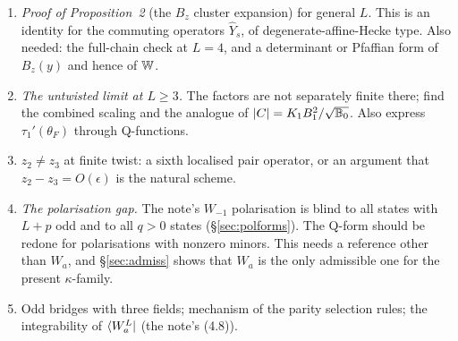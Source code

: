 \begin{enumerate}
  \emph{New route (untested idea, 13 Oct, after Proposition 1).} The proof of Proposition~1 works pair by pair. So any companion
  bra whose F sites are $e_4^Tf(G_c)q_p(G_c)$ on pair $p$, with A sites chosen to make each pair BPS, has the overlaps of a
  multi-block $W$-bra on the sectors $(\mu,0,0,-\mu)$. In particular, rotating the first $M$ pairs of $(e_1\otimes\tilde u)^{\otimes L}$
  by $g=1-\kappa G_c$ gives
  \begin{gather*}
  \Big\langle\big(e_1^T(1-\kappa G_c^T)\otimes\tilde u(1-\kappa G_c)^{-1}\big)^{\otimes M}\otimes(e_1\otimes\tilde u)^{\otimes(L-M)}\Big|\Psi_c\Big\rangle
  \;\propto\;\braket{W_{a'}^{M}\otimes W_{\kappa_0}^{L-M}}{\Psi},\\
  a'=\kappa_0\frac{1-\kappa z_4}{1-\kappa z_1}.
  \end{gather*}
  The diagonal images are $v_j=\lambda_j(1-\kappa z_j)$ and $u_j=f(z_j)/(1-\kappa z_j)$, so $u_2=u_3=0$ and $v\cdot u=0$. This needs
  neither the $\kappa$-family nor $z_2=z_3$: on the bare SoV vacuum every site localises (\S\ref{sec:loc}). The open question is
  the closed form of its SoV coefficients, which involve A-site words on the first $M$ pairs, F-site words everywhere, and
  exchange and singlet-channel terms; the analogue of Proposition~2 is needed. Test first at $L=2$, $M=1$ against the
  $\kappa$-family result, then at $L=4$, $M=2$.
\item \emph{Proof of Proposition~2} (the $B_z$ cluster expansion) for general $L$. This is an identity for the commuting
  operators $\hat Y_s$, of degenerate-affine-Hecke type. Also needed: the full-chain check at $L=4$, and a determinant or
  Pfaffian form of $B_z(y)$ and hence of $\mathbb W$.
\item \emph{The untwisted limit at $L\ge3$.} The factors are not separately finite there; find the combined scaling and the
  analogue of $|C|=K_1B_1^2/\sqrt{\mathbb B_0}$. Also express $\tau_1'(\theta_F)$ through Q-functions.
\item $z_2\ne z_3$ at finite twist: a sixth localised pair operator, or an argument that $z_2-z_3=O(\epsilon)$ is the natural
  scheme.
\item \emph{The polarisation gap.} The note's $W_{-1}$ polarisation is blind to all states with $L+p$ odd and to all $q>0$
  states (\S\ref{sec:polforms}). The Q-form should be redone for polarisations with nonzero minors. This needs a reference
  other than $W_a$, and \S\ref{sec:admiss} shows that $W_a$ is the only admissible one for the present $\kappa$-family.
\item Odd bridges with three fields; mechanism of the parity selection rules; the integrability of $\langle W_a^L|$ (the note's
  (4.8)).
\end{enumerate}

